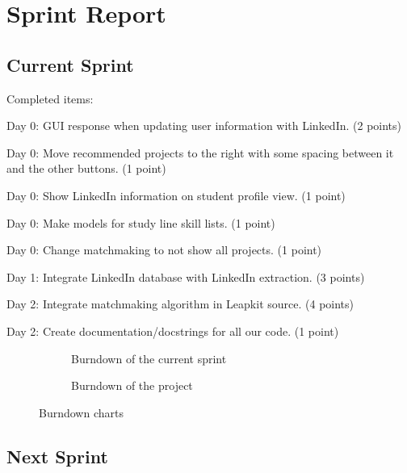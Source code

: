 \section{Sprint Report}

\subsection{Current Sprint}
Completed items:
\begin{itemize*}
    \item Day 0: GUI response when updating user information with LinkedIn. (2 points)
    \item Day 0: Move recommended projects to the right with some spacing between it and the other buttons. (1 point)
    \item Day 0: Show LinkedIn information on student profile view. (1 point)
    \item Day 0: Make models for study line skill lists. (1 point)
    \item Day 0: Change matchmaking to not show all projects. (1 point)
    \item Day 1: Integrate LinkedIn database with LinkedIn extraction. (3 points)
    \item Day 2: Integrate matchmaking algorithm in Leapkit source. (4 points)
    \item Day 2: Create documentation/docstrings for all our code. (1 point)
\end{itemize*}

\begin{figure}[!ht]
    \centering
    \begin{subfigure}[b]{0.5\textwidth}
        \scalebox{.6}{}
        \caption{Burndown of the current sprint}
        \label{fig:burndownSprint}
    \end{subfigure}%
    \begin{subfigure}[b]{0.5\textwidth}
        \scalebox{.7}{}
        \caption{Burndown of the project}
        \label{fig:burndownProject}
    \end{subfigure}
    \caption{Burndown charts}
    \label{fig:burndown}
\end{figure}

\subsection{Next Sprint}


